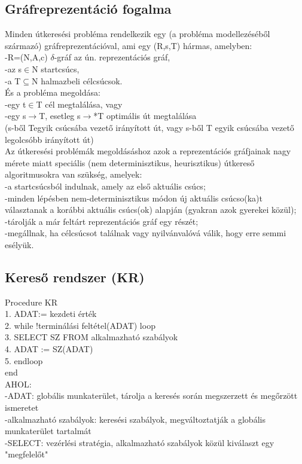 \documentclass{article}
\begin{document}
	\subsection{Gráfreprezentáció fogalma}
	Minden útkeresési probléma rendelkezik egy (a probléma modellezéséből származó) gráfreprezentációval, ami egy (R,s,T) hármas, amelyben:\\
	-R=(N,A,c) $\delta$-gráf az ún. reprezentációs gráf,\\
	-az s$\in$N startcsúcs,\\
	-a T$\subseteq$N halmazbeli célcsúcsok.\\
	És a probléma megoldása:\\
	-egy t$\in$T cél megtalálása, vagy\\
	-egy s$\rightarrow$T, esetleg s$\rightarrow$*T optimális út megtalálása\\
	(s-ből Tegyik csúcsába vezető irányított út, vagy s-ből T egyik csúcsába vezető legolcsóbb irányított út)\\
	Az útkeresési problémák megoldásáshoz azok a reprezentációs gráfjainak nagy mérete miatt speciális (nem determinisztikus, heurisztikus) útkereső algoritmusokra van szükség, amelyek:\\
	-a startcsúcsból indulnak, amely az első aktuális csúcs;\\
	-minden lépésben nem-determinisztikus módon új aktuális csúcso(ka)t választanak a korábbi aktuális csúcs(ok) alapján (gyakran azok gyerekei közül);\\
	-tárolják a már feltárt reprezentációs gráf egy részét;\\
	-megállnak, ha célcsúcsot találnak vagy nyilvánvalóvá válik, hogy erre semmi esélyük.\\
	
	\subsection{Kereső rendszer (KR)}
	Procedure KR\\
	1. ADAT:= kezdeti érték\\
	2. while !terminálási feltétel(ADAT) loop\\
	3. \quad SELECT SZ FROM alkalmazható szabályok\\
	4. \quad ADAT := SZ(ADAT)\\
	5. endloop\\
	end\\
	AHOL:\\
	-ADAT: globális munkaterület, tárolja a keresés során megszerzett és megőrzött ismeretet\\
	-alkalmazható szabályok: keresési szabályok, megváltoztatják a globális munkaterület tartalmát\\
	-SELECT: vezérlési stratégia, alkalmazható szabályok közül kiválaszt egy "megfelelőt"
	
\end{document}
